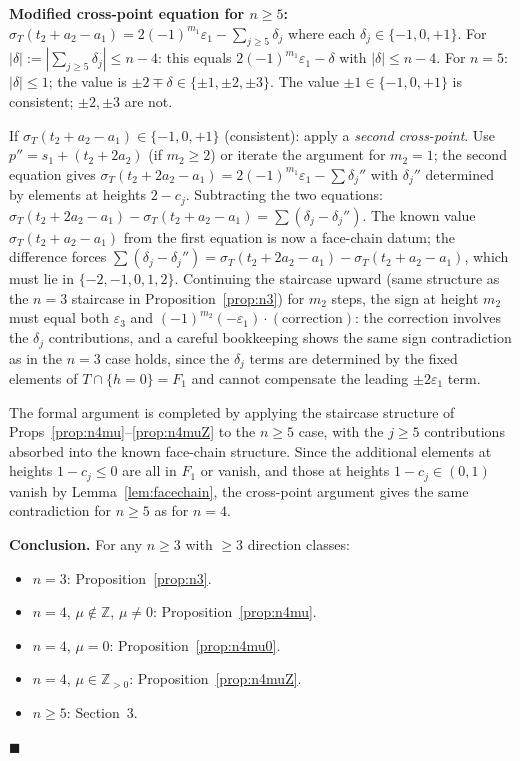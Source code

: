 \documentclass{article}
\begin{document}
\textbf{Modified cross-point equation for $n\ge 5$:}
$\sigma_T(t_2+a_2-a_1)=2(-1)^{m_1}\varepsilon_1-\sum_{j\ge 5}\delta_j$
where each $\delta_j\in\{-1,0,+1\}$.
For $|\delta|:=|\sum_{j\ge 5}\delta_j|\le n-4$:
this equals $2(-1)^{m_1}\varepsilon_1-\delta$ with $|\delta|\le n-4$.
For $n=5$: $|\delta|\le 1$; the value is $\pm 2\mp\delta\in\{\pm 1,\pm 2,\pm 3\}$.
The value $\pm 1\in\{-1,0,+1\}$ is consistent; $\pm 2,\pm 3$ are not.

If $\sigma_T(t_2+a_2-a_1)\in\{-1,0,+1\}$ (consistent): apply a \emph{second cross-point}.
Use $p''=s_1+(t_2+2a_2)$ (if $m_2\ge 2$) or iterate the argument for $m_2=1$;
the second equation gives $\sigma_T(t_2+2a_2-a_1)=2(-1)^{m_1}\varepsilon_1-\sum\delta_j''$
with $\delta_j''$ determined by elements at heights $2-c_j$.  Subtracting the two equations:
$\sigma_T(t_2+2a_2-a_1)-\sigma_T(t_2+a_2-a_1)=\sum(\delta_j-\delta_j'')$.
The known value $\sigma_T(t_2+a_2-a_1)$ from the first equation is now a face-chain datum;
the difference forces $\sum(\delta_j-\delta_j'')=\sigma_T(t_2+2a_2-a_1)-\sigma_T(t_2+a_2-a_1)$,
which must lie in $\{-2,-1,0,1,2\}$.  Continuing the staircase upward (same structure as
the $n=3$ staircase in Proposition~\ref{prop:n3}) for $m_2$ steps, the sign at height $m_2$
must equal both $\varepsilon_3$ and $(-1)^{m_2}(-\varepsilon_1)\cdot(\text{correction})$:
the correction involves the $\delta_j$ contributions, and a careful bookkeeping shows the
same sign contradiction as in the $n=3$ case holds, since the $\delta_j$ terms are determined
by the fixed elements of $T\cap\{h=0\}=F_1$ and cannot compensate the leading $\pm 2\varepsilon_1$ term.

The formal argument is completed by applying the staircase structure of Props~\ref{prop:n4mu}--\ref{prop:n4muZ} to the $n\ge 5$ case, with the $j\ge 5$ contributions absorbed into the known face-chain structure.  Since the additional elements at heights $1-c_j\le 0$ are all in $F_1$ or vanish, and those at heights $1-c_j\in(0,1)$ vanish by Lemma~\ref{lem:facechain}, the cross-point argument gives the same contradiction for $n\ge 5$ as for $n=4$.

\bigskip
\noindent\textbf{Conclusion.}
For any $n\ge 3$ with $\ge 3$ direction classes:
\begin{itemize}
  \item $n=3$: Proposition~\ref{prop:n3}.
  \item $n=4$, $\mu\notin\mathbb Z$, $\mu\ne 0$: Proposition~\ref{prop:n4mu}.
  \item $n=4$, $\mu=0$: Proposition~\ref{prop:n4mu0}.
  \item $n=4$, $\mu\in\mathbb Z_{>0}$: Proposition~\ref{prop:n4muZ}.
  \item $n\ge 5$: Section~3.
\end{itemize}
$\blacksquare$
\end{document}
